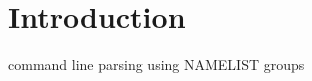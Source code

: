 \hypertarget{index_Introduction}{}\section{Introduction}\label{index_Introduction}
command line parsing using N\+A\+M\+E\+L\+I\+ST groups

 